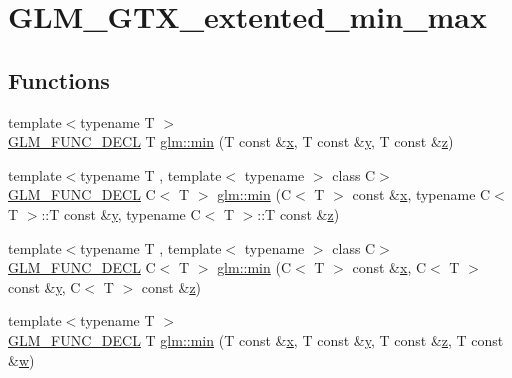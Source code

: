 \hypertarget{group__gtx__extented__min__max}{}\section{G\+L\+M\+\_\+\+G\+T\+X\+\_\+extented\+\_\+min\+\_\+max}
\label{group__gtx__extented__min__max}
\subsection*{Functions}
\begin{DoxyCompactItemize}
\item 
{\footnotesize template$<$typename T $>$ }\\\mbox{\hyperlink{setup_8hpp_ab2d052de21a70539923e9bcbf6e83a51}{G\+L\+M\+\_\+\+F\+U\+N\+C\+\_\+\+D\+E\+CL}} T \mbox{\hyperlink{group__gtx__extented__min__max_ga713d3f9b3e76312c0d314e0c8611a6a6}{glm\+::min}} (T const \&\mbox{\hyperlink{glad_8h_a92d0386e5c19fb81ea88c9f99644ab1d}{x}}, T const \&\mbox{\hyperlink{glad_8h_a66ddd433d2cacfe27f5906b7e86faeed}{y}}, T const \&\mbox{\hyperlink{glad_8h_acb78bf1972d3eaf07da34ff2e0a2f133}{z}})
\item 
{\footnotesize template$<$typename T , template$<$ typename $>$ class C$>$ }\\\mbox{\hyperlink{setup_8hpp_ab2d052de21a70539923e9bcbf6e83a51}{G\+L\+M\+\_\+\+F\+U\+N\+C\+\_\+\+D\+E\+CL}} C$<$ T $>$ \mbox{\hyperlink{group__gtx__extented__min__max_ga74d1a96e7cdbac40f6d35142d3bcbbd4}{glm\+::min}} (C$<$ T $>$ const \&\mbox{\hyperlink{glad_8h_a92d0386e5c19fb81ea88c9f99644ab1d}{x}}, typename C$<$ T $>$\+::T const \&\mbox{\hyperlink{glad_8h_a66ddd433d2cacfe27f5906b7e86faeed}{y}}, typename C$<$ T $>$\+::T const \&\mbox{\hyperlink{glad_8h_acb78bf1972d3eaf07da34ff2e0a2f133}{z}})
\item 
{\footnotesize template$<$typename T , template$<$ typename $>$ class C$>$ }\\\mbox{\hyperlink{setup_8hpp_ab2d052de21a70539923e9bcbf6e83a51}{G\+L\+M\+\_\+\+F\+U\+N\+C\+\_\+\+D\+E\+CL}} C$<$ T $>$ \mbox{\hyperlink{group__gtx__extented__min__max_ga42b5c3fc027fd3d9a50d2ccc9126d9f0}{glm\+::min}} (C$<$ T $>$ const \&\mbox{\hyperlink{glad_8h_a92d0386e5c19fb81ea88c9f99644ab1d}{x}}, C$<$ T $>$ const \&\mbox{\hyperlink{glad_8h_a66ddd433d2cacfe27f5906b7e86faeed}{y}}, C$<$ T $>$ const \&\mbox{\hyperlink{glad_8h_acb78bf1972d3eaf07da34ff2e0a2f133}{z}})
\item 
{\footnotesize template$<$typename T $>$ }\\\mbox{\hyperlink{setup_8hpp_ab2d052de21a70539923e9bcbf6e83a51}{G\+L\+M\+\_\+\+F\+U\+N\+C\+\_\+\+D\+E\+CL}} T \mbox{\hyperlink{group__gtx__extented__min__max_ga95466987024d03039607f09e69813d69}{glm\+::min}} (T const \&\mbox{\hyperlink{glad_8h_a92d0386e5c19fb81ea88c9f99644ab1d}{x}}, T const \&\mbox{\hyperlink{glad_8h_a66ddd433d2cacfe27f5906b7e86faeed}{y}}, T const \&\mbox{\hyperlink{glad_8h_acb78bf1972d3eaf07da34ff2e0a2f133}{z}}, T const \&\mbox{\hyperlink{glad_8h_a1d0296e9e835f2e1ee17634af95fc1ec}{w}})

\end{DoxyCompactItemize}
